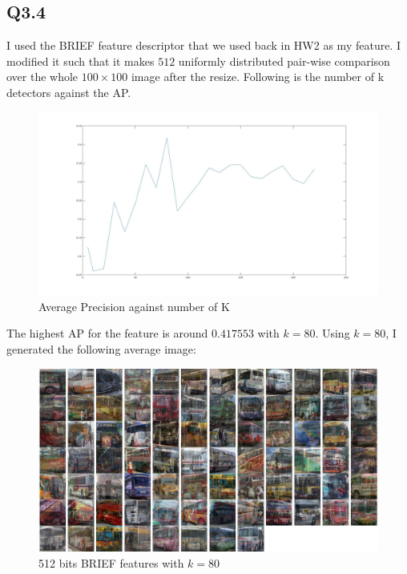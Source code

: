 \documentclass{article}
\begin{document}
\subsection*{Q3.4}
I used the BRIEF feature descriptor that we used back in HW2 as my feature. I modified it such that it makes $512$ uniformly distributed pair-wise comparison over the whole $100 \times 100$ image after the resize. Following is the number of k detectors against the AP.
\begin{figure}[H]
    \centering
    \includegraphics[width=6.5in]{./figures/q35_plot.jpg}
    \caption{Average Precision against number of K}
\end{figure}
The highest AP for the feature is around $0.417553$ with $k=80$. Using $k=80$, I generated the following average image:
\begin{figure}[H]
    \centering
    \includegraphics[width=6.5in]{./figures/q35_graph.jpg}
    \caption{512 bits BRIEF features with $k=80$}
\end{figure}
\end{document}
